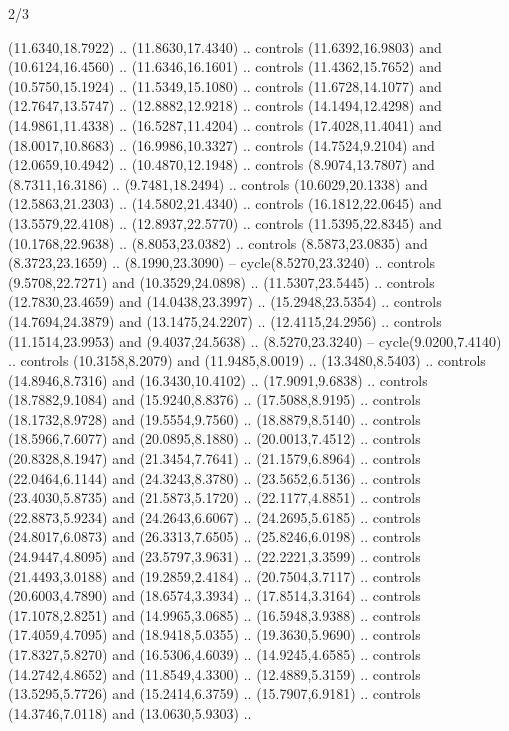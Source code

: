 \begin{flagdescription}{2/3}
\begin{scope}[yshift=\flagwidth,scale=\flagwidth/1241.93737]
\begin{scope}[y=-1mm, x=1mm,draw=gold,fill=blue,line join=miter,miter limit=4,line width=1.8\lw]
\begin{scope}[y=1mm, x=1mm, yscale=-1,shift={(573.68mm+\str,145.75)}]
\begin{scope}[scale=1.35,shift={(-9,-3)}]
\begin{scope}[scale=0.55]
\begin{scope}[scale=1.333]
    (11.6340,18.7922) .. (11.8630,17.4340) .. controls (11.6392,16.9803) and
    (10.6124,16.4560) .. (11.6346,16.1601) .. controls (11.4362,15.7652) and
    (10.5750,15.1924) .. (11.5349,15.1080) .. controls (11.6728,14.1077) and
    (12.7647,13.5747) .. (12.8882,12.9218) .. controls (14.1494,12.4298) and
    (14.9861,11.4338) .. (16.5287,11.4204) .. controls (17.4028,11.4041) and
    (18.0017,10.8683) .. (16.9986,10.3327) .. controls (14.7524,9.2104) and
    (12.0659,10.4942) .. (10.4870,12.1948) .. controls (8.9074,13.7807) and
    (8.7311,16.3186) .. (9.7481,18.2494) .. controls (10.6029,20.1338) and
    (12.5863,21.2303) .. (14.5802,21.4340) .. controls (16.1812,22.0645) and
    (13.5579,22.4108) .. (12.8937,22.5770) .. controls (11.5395,22.8345) and
    (10.1768,22.9638) .. (8.8053,23.0382) .. controls (8.5873,23.0835) and
    (8.3723,23.1659) .. (8.1990,23.3090) -- cycle(8.5270,23.3240) .. controls
    (9.5708,22.7271) and (10.3529,24.0898) .. (11.5307,23.5445) .. controls
    (12.7830,23.4659) and (14.0438,23.3997) .. (15.2948,23.5354) .. controls
    (14.7694,24.3879) and (13.1475,24.2207) .. (12.4115,24.2956) .. controls
    (11.1514,23.9953) and (9.4037,24.5638) .. (8.5270,23.3240) --
    cycle(9.0200,7.4140) .. controls (10.3158,8.2079) and (11.9485,8.0019) ..
    (13.3480,8.5403) .. controls (14.8946,8.7316) and (16.3430,10.4102) ..
    (17.9091,9.6838) .. controls (18.7882,9.1084) and (15.9240,8.8376) ..
    (17.5088,8.9195) .. controls (18.1732,8.9728) and (19.5554,9.7560) ..
    (18.8879,8.5140) .. controls (18.5966,7.6077) and (20.0895,8.1880) ..
    (20.0013,7.4512) .. controls (20.8328,8.1947) and (21.3454,7.7641) ..
    (21.1579,6.8964) .. controls (22.0464,6.1144) and (24.3243,8.3780) ..
    (23.5652,6.5136) .. controls (23.4030,5.8735) and (21.5873,5.1720) ..
    (22.1177,4.8851) .. controls (22.8873,5.9234) and (24.2643,6.6067) ..
    (24.2695,5.6185) .. controls (24.8017,6.0873) and (26.3313,7.6505) ..
    (25.8246,6.0198) .. controls (24.9447,4.8095) and (23.5797,3.9631) ..
    (22.2221,3.3599) .. controls (21.4493,3.0188) and (19.2859,2.4184) ..
    (20.7504,3.7117) .. controls (20.6003,4.7890) and (18.6574,3.3934) ..
    (17.8514,3.3164) .. controls (17.1078,2.8251) and (14.9965,3.0685) ..
    (16.5948,3.9388) .. controls (17.4059,4.7095) and (18.9418,5.0355) ..
    (19.3630,5.9690) .. controls (17.8327,5.8270) and (16.5306,4.6039) ..
    (14.9245,4.6585) .. controls (14.2742,4.8652) and (11.8549,4.3300) ..
    (12.4889,5.3159) .. controls (13.5295,5.7726) and (15.2414,6.3759) ..
    (15.7907,6.9181) .. controls (14.3746,7.0118) and (13.0630,5.9303) ..

\end{scope}
\end{scope}
\end{scope}
\end{scope}
\end{scope}
\end{scope}
\end{flagdescription}
